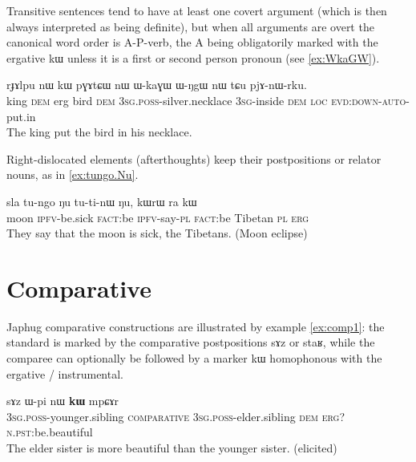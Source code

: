\documentclass[oldfontcommands,oneside,a4paper,11pt]{article}
\newcommand{\ipa}[1]{{\phon #1}} %
\begin{document}
Transitive sentences tend to have at least one covert argument (which is then always interpreted as being definite), but when all arguments are overt the canonical word order is A-P-verb, the A being obligatorily marked with the ergative \ipa{kɯ} unless it is a first or second person pronoun (see \ref{ex:WkaGW}).

\begin{exe}
\ex \label{ex:WkaGW}
\gll
\ipa{rɟɤlpu} 	\ipa{nɯ} 	\ipa{kɯ} 	\ipa{pɣɤtɕɯ} 	\ipa{nɯ} 	\ipa{ɯ-kaɣɯ} 	\ipa{ɯ-ŋgɯ} 	\ipa{nɯ} 	\ipa{tɕu} 	\ipa{pjɤ-nɯ-rku.} \\
king \textsc{dem} erg bird \textsc{dem} \textsc{3sg.poss}-silver.necklace \textsc{3sg}-inside \textsc{dem} \textsc{loc} \textsc{evd:down-auto}-put.in \\
\glt The king put the bird in his necklace.
\end{exe}

Right-dislocated elements (afterthoughts) keep their postpositions or relator nouns, as in \ref{ex:tungo.Nu}.

\begin{exe}
\ex \label{ex:tungo.Nu}
\gll
\ipa{sla} 	\ipa{tu-ngo} 	\ipa{ŋu} 	\ipa{tu-ti-nɯ} 	\ipa{ŋu,} 	\ipa{kɯrɯ} 	\ipa{ra} 	\ipa{kɯ} \\
moon \textsc{ipfv}-be.sick \textsc{fact}:be \textsc{ipfv}-say-\textsc{pl} \textsc{fact}:be  Tibetan \textsc{pl} \textsc{erg} \\
\glt They say that the moon is sick, the Tibetans. (Moon eclipse)
\end{exe}

\section{Comparative}

Japhug comparative constructions are illustrated by example \ref{ex:comp1}: the standard is marked by the comparative postpositions \ipa{sɤz} or \ipa{staʁ}, while the comparee can optionally be followed by a marker \ipa{kɯ} homophonous with the ergative / instrumental.

\begin{exe}
\ex \label{ex:comp1}
\gll  \ipa{ɯ-ʁi}   	\ipa{sɤz}   	\ipa{ɯ-pi}   	\ipa{nɯ}   	\ipa{\textbf{kɯ}}   	\ipa{mpɕɤr}     \\
\textsc{3sg.poss}-younger.sibling \textsc{comparative} \textsc{3sg.poss}-elder.sibling \textsc{dem} \textsc{erg?}  \textsc{n.pst:}be.beautiful \\
\glt The elder sister is more beautiful than the younger sister. (elicited)
\end{exe}
\end{document}
